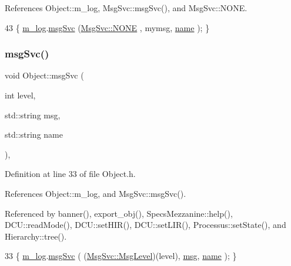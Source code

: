 References Object\+::m\+\_\+log, Msg\+Svc\+::msg\+Svc(), and Msg\+Svc\+::\+N\+O\+NE.


\begin{DoxyCode}
43 \{ \hyperlink{classObject_a0d269813dd7ac1f24bc143031e2963f2}{m\_log}.\hyperlink{classMsgSvc_ad25f18047920cc59a314e5098259711c}{msgSvc} (\hyperlink{classMsgSvc_ae671eb7301996cd049d2da8a65925926a9be9ae32fed8e1e6eba4a58692210fbd}{MsgSvc::NONE}    , mymsg, \hyperlink{classObject_a300f4c05dd468c7bb8b3c968868443c1}{name} ); \}
\end{DoxyCode}
\mbox{\label{classObject_a3f9d5537ebce0c0f2bf6ae4d92426f3c}} 
\subsubsection{\texorpdfstring{msg\+Svc()}{msgSvc()}}
{\footnotesize\ttfamily void Object\+::msg\+Svc (\begin{DoxyParamCaption}\item[{int}]{level,  }\item[{std\+::string}]{msg,  }\item[{std\+::string}]{name }\end{DoxyParamCaption})\hspace{0.3cm}{\ttfamily [inline]}, {\ttfamily [inherited]}}



Definition at line 33 of file Object.\+h.



References Object\+::m\+\_\+log, and Msg\+Svc\+::msg\+Svc().



Referenced by banner(), export\+\_\+obj(), Specs\+Mezzanine\+::help(), D\+C\+U\+::read\+Mode(), D\+C\+U\+::set\+H\+I\+R(), D\+C\+U\+::set\+L\+I\+R(), Processus\+::set\+State(), and Hierarchy\+::tree().


\begin{DoxyCode}
33 \{ \hyperlink{classObject_a0d269813dd7ac1f24bc143031e2963f2}{m\_log}.\hyperlink{classMsgSvc_ad25f18047920cc59a314e5098259711c}{msgSvc} ( (\hyperlink{classMsgSvc_ae671eb7301996cd049d2da8a65925926}{MsgSvc::MsgLevel})(level), \hyperlink{classObject_a58b2d0618c2d08cf2383012611528d97}{msg}, 
      \hyperlink{classObject_a300f4c05dd468c7bb8b3c968868443c1}{name} ); \}
\end{DoxyCode}
\mbox{\label{classObject_a300f4c05dd468c7bb8b3c968868443c1}} 
